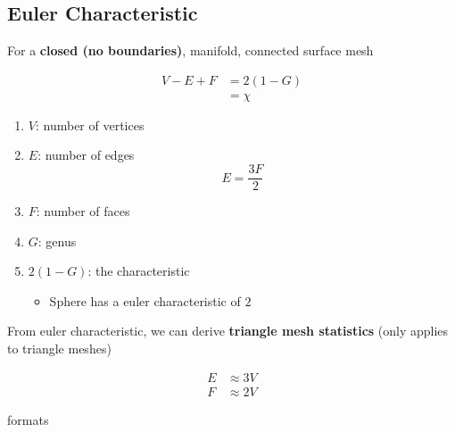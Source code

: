   \subsection{Euler Characteristic}

    For a \textbf{closed (no boundaries)}, manifold, connected surface mesh

    \begin{align}
      V - E + F &= 2 \left( 1 - G \right) \\
      &= \chi
    \end{align}

    \begin{enumerate}
      \item $ V $: number of vertices
      \item $ E $: number of edges
      \begin{equation}
        E = \frac{3F}{2}
      \end{equation}

      \item $ F $: number of faces
      \item $ G $: genus
      \item $ 2 \left( 1 - G \right) $: the characteristic
      \begin{itemize}
        \item Sphere has a euler characteristic of $ 2 $
      \end{itemize}
    \end{enumerate}

    From euler characteristic, we can derive \textbf{triangle mesh statistics}
    (only applies to triangle meshes)

    \begin{align}
      E &\approx 3V \\
      F &\approx 2V
    \end{align}

{formats}
